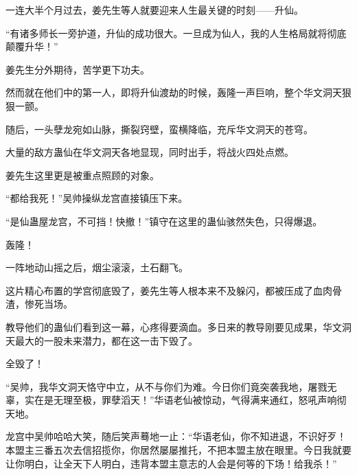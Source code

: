 \begin{this_body}
一连大半个月过去，姜先生等人就要迎来人生最关键的时刻——升仙。

“有诸多师长一旁护道，升仙的成功很大。一旦成为仙人，我的人生格局就将彻底颠覆升华！”

姜先生分外期待，苦学更下功夫。

然而就在他们中的第一人，即将升仙渡劫的时候，轰隆一声巨响，整个华文洞天狠狠一颤。

随后，一头孽龙宛如山脉，撕裂窍壁，蛮横降临，充斥华文洞天的苍穹。

大量的敌方蛊仙在华文洞天各地显现，同时出手，将战火四处点燃。

姜先生这里更是被重点照顾的对象。

“都给我死！”吴帅操纵龙宫直接镇压下来。

“是仙蛊屋龙宫，不可挡！快撤！”镇守在这里的蛊仙骇然失色，只得爆退。

轰隆！

一阵地动山摇之后，烟尘滚滚，土石翻飞。

这片精心布置的学宫彻底毁了，姜先生等人根本来不及躲闪，都被压成了血肉骨渣，惨死当场。

教导他们的蛊仙们看到这一幕，心疼得要滴血。多日来的教导刚要见成果，华文洞天最大的一股未来潜力，都在这一击下毁了。

全毁了！

“吴帅，我华文洞天恪守中立，从不与你们为难。今日你们竟突袭我地，屠戮无辜，实在是无理至极，罪孽滔天！”华语老仙被惊动，气得满来通红，怒吼声响彻天地。

龙宫中吴帅哈哈大笑，随后笑声蓦地一止：“华语老仙，你不知进退，不识好歹！本盟主三番五次去信招揽你，你居然屡屡推托，不把本盟主放在眼里。今日我就要让你明白，让全天下人明白，违背本盟主意志的人会是何等的下场！给我杀！”

\end{this_body}

